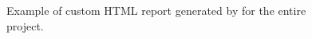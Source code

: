 \begin{figure}[!ht]
\begin{center}
\qquad
{}
\caption{Example of custom HTML report generated by \toolname for
the entire project.}\label{fig:custom-html-report}
\end{center}
\end{figure}
